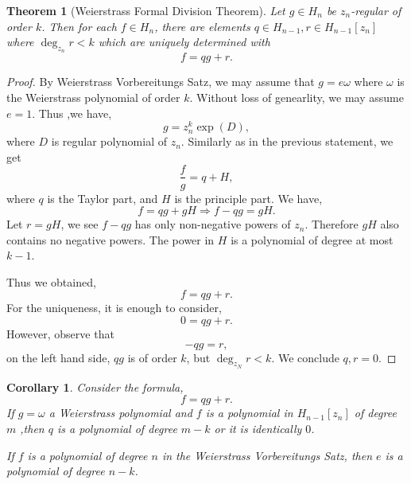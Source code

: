 \documentclass{article}
\newtheorem{theorem}{Theorem} [section]
\newtheorem{corollary}{Corollary} [section]
\begin{document}
\begin{theorem}[Weierstrass Formal Division Theorem]
Let $g\in H_n$ be $z_n$-regular of order $k$. Then for each $f \in H_n$, there are elements $q\in H_{n-1},r\in H_{n-1}[z_n]$ where $\deg_{z_n} r <k $ which are uniquely determined with 
\begin{equation*}
  f = qg +r.
\end{equation*}
\end{theorem}
\begin{proof}
  By Weierstrass Vorbereitungs Satz, we may assume that $g=e\omega$ where $\omega$ is the Weierstrass polynomial of order $k$. Without loss of genearlity, we may assume $e = 1$. Thus ,we have,
  \begin{equation*}
    g = z_n^k\exp(D),
  \end{equation*}
  where $D$ is regular polynomial of $z_n$. Similarly as in the previous statement, we get 
  \begin{equation*}
    {\frac f g} = q + H,
  \end{equation*}
  where $q$ is the Taylor part, and $H$ is the principle part.
We have,
\begin{equation*}
  f = qg + gH \Rightarrow f-qg = gH.
\end{equation*}
Let $r = gH$, we see $f-qg$ has only non-negative powers of $z_n$. Therefore $gH$ also contains no negative powers. The power in $H$ is a polynomial of degree at most $k-1$.
\par Thus we obtained,
\begin{equation*}
  f = qg + r.
\end{equation*}
For the uniqueness, it is enough to consider,
\begin{equation*}
   0 = qg+r.
\end{equation*}
However, observe that 
\begin{equation*}
  -qg = r,
\end{equation*}
on the left hand side, $qg$ is of order $k$, but $\deg_{z_N}r<k$. We conclude $q,r = 0$.
\end{proof}
\begin{corollary} Consider the formula,
  \begin{equation*}
    f = qg +r.
  \end{equation*}
  If $g=\omega$ a Weierstrass polynomial and $f$ is a polynomial in $H_{n-1}[z_n]$ of degree $m$ ,then $q$ is a polynomial of degree $m-k$ or it is identically $0$.
  \par If $f$ is a polynomial of degree $n$ in the Weierstrass Vorbereitungs Satz, then $e$ is a polynomial of degree $n-k$. 
\end{corollary}
\end{document}
